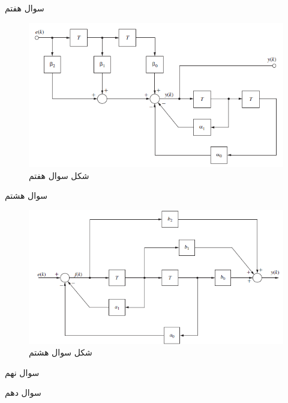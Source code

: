 \documentclass{article}
\begin{document}
\begin{problem}{سوال هفتم}
	
	
	
\end{problem}
\begin{figure}
	\includegraphics[width=\linewidth]{Second Series/2.png}
	\caption{شکل سوال هفتم}
\end{figure}

\begin{problem}{سوال هشتم}




\end{problem}
\begin{figure}
	\includegraphics[width=\linewidth]{Second Series/3.png}
	\caption{شکل سوال هشتم}
\end{figure}


\begin{problem}{سوال نهم}





\end{problem}


\begin{problem}{سوال دهم}
	
	
	
	
\end{problem}
\end{document}
